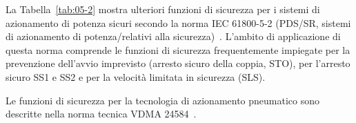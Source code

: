 La Tabella~\ref{tab:05-2} mostra ulteriori funzioni di sicurezza per i sistemi di azionamento di potenza sicuri secondo la norma IEC 61800-5-2 (PDS/SR, sistemi di azionamento di potenza/relativi alla sicurezza)~\cite{iec61800-5-2}. L’ambito di applicazione di questa norma comprende le funzioni di sicurezza frequentemente impiegate per la prevenzione dell’avvio imprevisto (arresto sicuro della coppia, STO), per l’arresto sicuro SS1 e SS2 e per la velocità limitata in sicurezza (SLS).

Le funzioni di sicurezza per la tecnologia di azionamento pneumatico sono descritte nella norma tecnica VDMA 24584~\cite{vdma24584}.


\begingroup
{}
\fontsize{9}{11}\selectfont
\setlength{\tabcolsep}{4pt}
\renewcommand{\arraystretch}{1.2}
\setlength{\LTcapwidth}{\textwidth}
